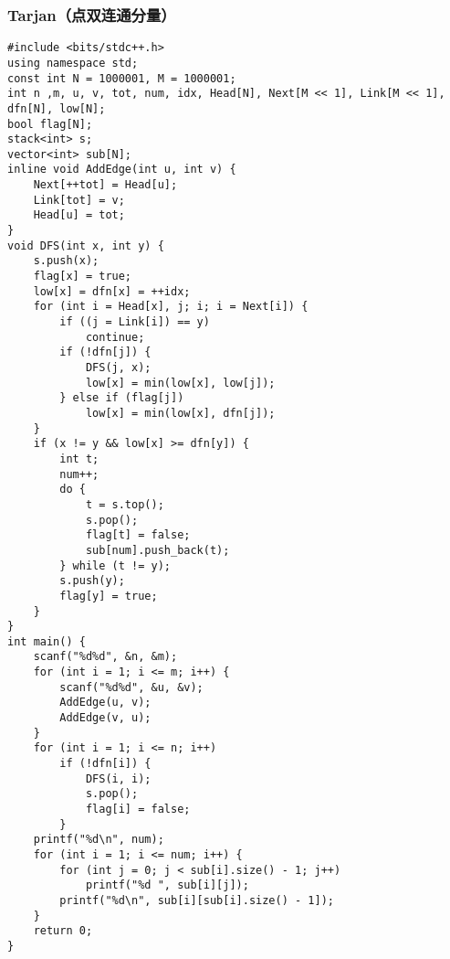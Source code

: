 ﻿\documentclass[a4paper]{article}
\begin{document}
\subsubsection{Tarjan（点双连通分量）}
\begin{lstlisting}
#include <bits/stdc++.h>
using namespace std;
const int N = 1000001, M = 1000001;
int n ,m, u, v, tot, num, idx, Head[N], Next[M << 1], Link[M << 1], dfn[N], low[N];
bool flag[N];
stack<int> s;
vector<int> sub[N];
inline void AddEdge(int u, int v) {
    Next[++tot] = Head[u];
    Link[tot] = v;
    Head[u] = tot;
}
void DFS(int x, int y) {
    s.push(x);
    flag[x] = true;
    low[x] = dfn[x] = ++idx;
    for (int i = Head[x], j; i; i = Next[i]) {
        if ((j = Link[i]) == y)
            continue;
        if (!dfn[j]) {
            DFS(j, x);
            low[x] = min(low[x], low[j]);
        } else if (flag[j])
            low[x] = min(low[x], dfn[j]);
    }
    if (x != y && low[x] >= dfn[y]) {
        int t;
        num++;
        do {
            t = s.top();
            s.pop();
            flag[t] = false;
            sub[num].push_back(t);
        } while (t != y);
        s.push(y);
        flag[y] = true;
    }
}
int main() {
    scanf("%d%d", &n, &m);
    for (int i = 1; i <= m; i++) {
        scanf("%d%d", &u, &v);
        AddEdge(u, v);
        AddEdge(v, u);
    }
    for (int i = 1; i <= n; i++)
        if (!dfn[i]) {
            DFS(i, i);
            s.pop();
            flag[i] = false;
        }
    printf("%d\n", num);
    for (int i = 1; i <= num; i++) {
        for (int j = 0; j < sub[i].size() - 1; j++)
            printf("%d ", sub[i][j]);
        printf("%d\n", sub[i][sub[i].size() - 1]);
    }
    return 0;
}
\end{lstlisting}
\end{document}
